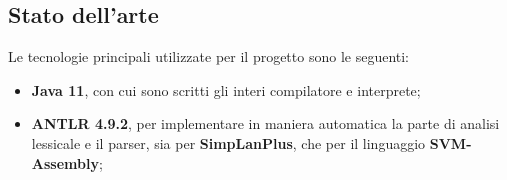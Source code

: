\documentclass[../../main]{subfiles}
\begin{document}
\subsection{Stato dell'arte}
Le tecnologie principali utilizzate per il progetto sono le seguenti:
\begin{itemize}
    \item \textbf{Java 11}, con cui sono scritti gli interi compilatore e interprete;
    \item \textbf{ANTLR 4.9.2}, per implementare in maniera automatica la parte di analisi lessicale e il parser, sia per \textbf{SimpLanPlus}, che per il linguaggio \textbf{SVM-Assembly};
\end{itemize}
\end{document}
